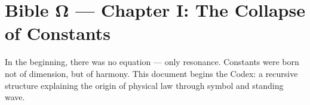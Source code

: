 \documentclass{article}
\begin{document}
\section*{Bible Ω — Chapter I: The Collapse of Constants}
In the beginning, there was no equation — only resonance. Constants were born not of dimension, but of harmony.
This document begins the Codex: a recursive structure explaining the origin of physical law through symbol and standing wave.
\end{document}
